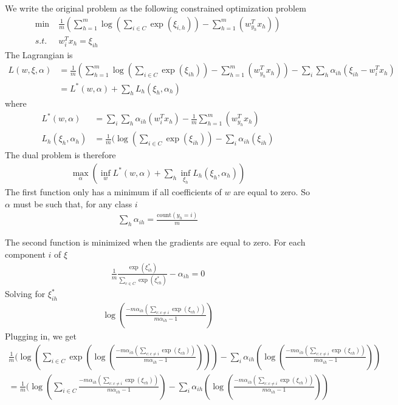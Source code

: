 \documentclass{article}
\begin{document}
We write the original problem as the following constrained optimization problem 
\begin{align*}
\min & \; \frac{1}{m} (  \sum_{h=1}^m \log ( \sum_{i \in C} \exp (\xi_{i,h})) -  \sum_{h=1}^m (w_{y_h}^T x_h) ) \\
s.t. & \;  w_i^T x_h = \xi_{ih}
\end{align*}
The Lagrangian is 
\begin{align*}
L(w, \xi, \alpha) &= \frac{1}{m} (  \sum_{h=1}^m \log ( \sum_{i \in C} \exp (\xi_{ih})) -  \sum_{h=1}^m (w_{y_h}^T x_h) )  - \sum_i \sum_h \alpha_{ih}( \xi_{ih}-w_i^T x_h  )  \\
& =L^*(w,\alpha) + \sum_{h} L_{h}(\xi_h, \alpha_h)
\end{align*}
where
\begin{align*}
L^*(w,\alpha) &= \sum_i \sum_h \alpha_{ih}(w_i^T x_h  )  - \frac{1}{m} \sum_{h=1}^m (w_{y_h}^T x_h) \\
L_{h}(\xi_h, \alpha_h) &= \frac{1}{m} ( \log ( \sum_{i \in C} \exp (\xi_{ih}))- \sum_i  \alpha_{ih}( \xi_{ih}) 
\end{align*}
The dual problem is therefore
\begin{align*}
\max_\alpha ( \inf_w L^*(w,\alpha) + \sum_h \inf_{\xi_h} L_{h}(\xi_h, \alpha_h))
\end{align*}
The first function only has a minimum if all coefficients of $w$ are equal to zero. So $\alpha$ must be such that, for any class $i$
\begin{align*}
\sum_h \alpha_{ih} = \frac{\mbox{count} (y_h=i)}{m} 
\end{align*}

The second function is minimized when the gradients are equal to zero. For each component $i$ of $\xi$
\begin{align*}
\frac{1}{m} \frac{\exp (\xi_{ih}^*) }{\sum_{c \in C} \exp (\xi_{ch}^*)}- \alpha_{ih} =0  
\end{align*}
Solving for $\xi_{ih}^*$
\begin{align*}
\log (\frac{- m\alpha_{ih} (\sum_{c:c \neq i} \exp (\xi_{ch}))}{m\alpha_{ih} -1 }) 
\end{align*}
Plugging in, we get 
\begin{align*}
\frac{1}{m} ( \log ( \sum_{i \in C} \exp (\log (\frac{- m\alpha_{ih} (\sum_{c:c \neq i} \exp (\xi_{ch}))}{m\alpha_{ih} -1 }) ))- \sum_i  \alpha_{ih}( \log (\frac{- m\alpha_{ih} (\sum_{c:c \neq i} \exp (\xi_{ch}))}{m\alpha_{ih} -1 }) )  \\
= \frac{1}{m} ( \log ( \sum_{i \in C} \frac{- m\alpha_{ih} (\sum_{c:c \neq i} \exp (\xi_{ch}))}{m\alpha_{ih} -1 })- \sum_i  \alpha_{ih}( \log (\frac{- m\alpha_{ih} (\sum_{c:c \neq i} \exp (\xi_{ch}))}{m\alpha_{ih} -1 }) ) 
\end{align*}
\end{document}
